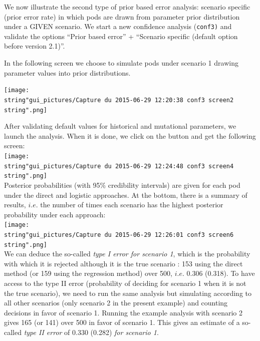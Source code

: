 We now illustrate the second type of prior based error analysis: scenario
specific (prior error rate) in which pods are drawn from parameter
prior distribution under a GIVEN scenario. We start a new confidence
analysis (\texttt{conf3)} and validate the options ``Prior based
error'' + ``Scenario specific (default option before version 2.1)''.

In the following screen we choose to simulate pods under scenario
1 drawing parameter values into prior distributions.

\texttt{[image: \\string"gui\_pictures/Capture du 2015-06-29 12:20:38 conf3 screen2\\string".png]}

After validating default values for historical and mutational parameters,
we launch the analysis. When it is done, we click on the  button and get the following screen:\\


\texttt{[image: \\string"gui\_pictures/Capture du 2015-06-29 12:24:48 conf3 screen4\\string".png]}\\


Posterior probabilities (with 95\% credibility intervals) are given
for each pod under the direct and logistic approaches. At the bottom,
there is a summary of results, $i.e.$ the number of times each scenario
has the highest posterior probability under each approach:\\


\texttt{[image: \\string"gui\_pictures/Capture du 2015-06-29 12:26:01 conf3 screen6\\string".png]}\\


We can deduce the so-called \textit{type I error for scenario 1},
which is the probability with which it is rejected although it is
the true scenario : 153 using the direct method (or 159 using the
regression method) over 500, $i.e.$ 0.306 (0.318). To have access
to the type II error (probability of deciding for scenario 1 when
it is not the true scenario), we need to run the same analysis but
simulating according to all other scenarios (only scenario 2 in the
present example) and counting decisions in favor of scenario 1. Running
the example analysis with scenario 2 gives 165 (or 141) over 500 in
favor of scenario 1. This gives an estimate of a so-called \textit{type
II error} of 0.330 (0.282) \textit{for scenario 1}.



